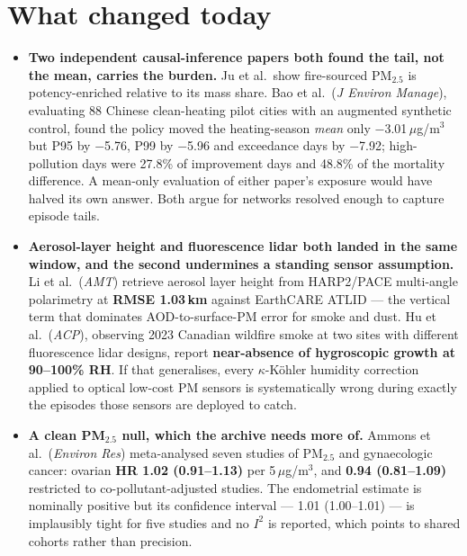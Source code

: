 \documentclass[10pt]{article}
\begin{document}
\section*{\sffamily\bfseries\color{Deep}What changed today}
\vspace{-1.5mm}{\color{Amber}\rule{\linewidth}{1.1pt}}\vspace{2.5mm}

\footnotesize
\begin{itemize}
\item \textbf{Two independent causal-inference papers both found the tail, not the mean,
carries the burden.} Ju et al.\ show fire-sourced PM$_{2.5}$ is potency-enriched relative
to its mass share. Bao et al.\ (\textit{J Environ Manage}), evaluating 88 Chinese
clean-heating pilot cities with an augmented synthetic control, found the policy moved the
heating-season \emph{mean} only $-$3.01\,$\mu$g/m$^3$ but P95 by $-$5.76, P99 by $-$5.96
and exceedance days by $-$7.92; high-pollution days were 27.8\% of improvement days and
48.8\% of the mortality difference. A mean-only evaluation of either paper's exposure
would have halved its own answer. Both argue for networks resolved enough to capture
episode tails.

\item \textbf{Aerosol-layer height and fluorescence lidar both landed in the same window,
and the second undermines a standing sensor assumption.} Li et al.\ (\textit{AMT})
retrieve aerosol layer height from HARP2/PACE multi-angle polarimetry at
\textbf{RMSE 1.03\,km} against EarthCARE ATLID --- the vertical term that dominates
AOD-to-surface-PM error for smoke and dust. Hu et al.\ (\textit{ACP}), observing 2023
Canadian wildfire smoke at two sites with different fluorescence lidar designs, report
\textbf{near-absence of hygroscopic growth at 90--100\% RH}. If that generalises, every
$\kappa$-K\"ohler humidity correction applied to optical low-cost PM sensors is
systematically wrong during exactly the episodes those sensors are deployed to catch.

\item \textbf{A clean PM$_{2.5}$ null, which the archive needs more of.} Ammons et al.\
(\textit{Environ Res}) meta-analysed seven studies of PM$_{2.5}$ and gynaecologic cancer:
ovarian \textbf{HR 1.02 (0.91--1.13)} per 5\,$\mu$g/m$^3$, and \textbf{0.94 (0.81--1.09)}
restricted to co-pollutant-adjusted studies. The endometrial estimate is nominally
positive but its confidence interval --- 1.01 (1.00--1.01) --- is implausibly tight for
five studies and no $I^2$ is reported, which points to shared cohorts rather than
precision.


\end{itemize}
\end{document}
